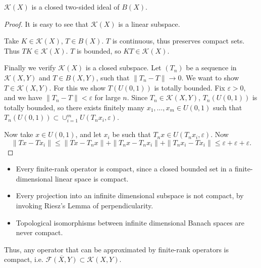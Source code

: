 \begin{proposition}
	\label{prop:CompactTwoSidedIdeal}
	$\mathcal{K}(X)$ is a closed two-sided ideal of $B(X)$.
\end{proposition}
\begin{proof}
	It is easy to see that $\mathcal{K}(X)$ is a linear subspace.

	Take $K \in \mathcal{K}(X)$, $T \in B(X)$. $T$ is continuous, thus preserves compact sets. Thus $TK \in \mathcal{K}(X)$. $T$ is bounded, so $KT \in \mathcal{K}(X)$.

	Finally we verify $\mathcal{K}(X)$ is a closed subspace. Let $\left( T_n \right) $ be a sequence in $\mathcal{K}(X, Y)$ and $T \in B(X, Y)$, such that $\|T_n - T\| \to 0$. We want to show $T \in \mathcal{K}(X, Y)$. For this we show $T(U(0,1))$ is totally bounded. Fix $\varepsilon > 0$, and we have $\|T_n - T\| < \varepsilon$ for large $n$. Since $T_n \in \mathcal{K}(X, Y)$, $T_n(U(0,1))$ is totally bounded, so there exists finitely many $x_1, \ldots, x_m \in U(0,1)$ such that $T_n(U(0,1)) \subset \cup_{i = 1}^m U(T_n x_i, \varepsilon)$. 

	Now take $x \in U(0,1)$, and let $x_i$ be such that $T_n x \in U(T_n x_i, \varepsilon)$. Now
	\[
		\|T x - T x_i\| 
		\le  \|T x - T_n x\| + \|T_n x - T_n x_i\| + \|T_n x_i - T x_i\|
		\le \varepsilon + \varepsilon + \varepsilon
	.\] 
\end{proof}

\begin{example}
	\begin{itemize}
		\item Every finite-rank operator is compact, since a closed bounded set in a finite-dimensional linear space is compact.
		\item Every projection into an infinite dimensional subspace is not compact, by invoking Riesz's Lemma of perpendicularity.
		\item Topological isomorphisms between infinite dimensional Banach spaces are never compact.
	\end{itemize}
\end{example}

Thus, any operator that can be approximated by finite-rank operators is compact, i.e. $\overline{\mathcal{F}(X,Y)} \subset \mathcal{K}(X,Y) $.

